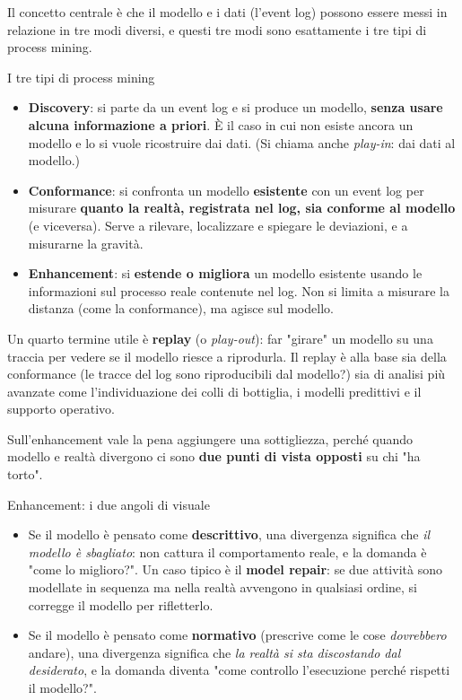 Il concetto centrale è che il modello e i dati (l'event log) possono essere messi in relazione in tre modi diversi, e questi tre modi sono esattamente i tre tipi di process mining.

\begin{boxdefinition}{I tre tipi di process mining}
\begin{itemize}
\item \textbf{Discovery}: si parte da un event log e si produce un modello, \textbf{senza usare alcuna informazione a priori}. È il caso in cui non esiste ancora un modello e lo si vuole ricostruire dai dati. (Si chiama anche \emph{play-in}: dai dati al modello.)
\item \textbf{Conformance}: si confronta un modello \textbf{esistente} con un event log per misurare \textbf{quanto la realtà, registrata nel log, sia conforme al modello} (e viceversa). Serve a rilevare, localizzare e spiegare le deviazioni, e a misurarne la gravità.
\item \textbf{Enhancement}: si \textbf{estende o migliora} un modello esistente usando le informazioni sul processo reale contenute nel log. Non si limita a misurare la distanza (come la conformance), ma agisce sul modello.
\end{itemize}
\end{boxdefinition}

Un quarto termine utile è \textbf{replay} (o \emph{play-out}): far "girare" un modello su una traccia per vedere se il modello riesce a riprodurla. Il replay è alla base sia della conformance (le tracce del log sono riproducibili dal modello?) sia di analisi più avanzate come l'individuazione dei colli di bottiglia, i modelli predittivi e il supporto operativo.

Sull'enhancement vale la pena aggiungere una sottigliezza, perché quando modello e realtà divergono ci sono \textbf{due punti di vista opposti} su chi "ha torto".

\begin{boxnote}{Enhancement: i due angoli di visuale}
\begin{itemize}
\item Se il modello è pensato come \textbf{descrittivo}, una divergenza significa che \emph{il modello è sbagliato}: non cattura il comportamento reale, e la domanda è "come lo miglioro?". Un caso tipico è il \textbf{model repair}: se due attività sono modellate in sequenza ma nella realtà avvengono in qualsiasi ordine, si corregge il modello per rifletterlo.
\item Se il modello è pensato come \textbf{normativo} (prescrive come le cose \emph{dovrebbero} andare), una divergenza significa che \emph{la realtà si sta discostando dal desiderato}, e la domanda diventa "come controllo l'esecuzione perché rispetti il modello?".
\end{itemize}
\end{boxnote}

